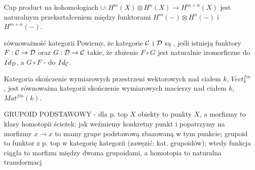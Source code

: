 \begin{example}
  Cup product na kohomologiach $\cup:H^m(X)\otimes H^n(X)\to H^{m+n}(X)$ jest naturalnym przekształceniem między funktorami $H^m(-)\otimes H^n(-)$ i $H^{m+n}(-)$.
\end{example}

\begin{definition}{równoważność kategorii}{}
  Powiemy, że kategorie $\mathcal{C}$ i $\mathcal{D}$ są , jeśli istnieją funktory $F:\mathcal{C}\to\mathcal{D}$ oraz $G:\mathcal{D}\to\mathcal{C}$ takie, że złożenie $F\circ G$ jest naturalnie izomorficzne do $Id_{\mathcal{D}}$, a $G\circ F$ - do $Id_{\mathcal{C}}$.
\end{definition}

\begin{example}
  Kategoria skończenie wymiarowych przestrzeni wektorowych nad ciałem $k$, $Vect_{k}^{fin}$, jest równoważna kategorii skończenie wymiarowych macierzy nad ciałem $k$, $Mat^{fin}(k)$.
\end{example}

{\color{red}GRUPOID PODSTAWOWY - dla p. top  $X$ obiekty to punkty $X$, a morfizmy to klasy homotopii ścieżek; jak weźmiemy konkretny punkt i popatrzymy na morfizmy $x\to x$ to mamy grupe podstawową zbazowaną w tym punkcie; grupoid to funktor z p. top w kategorię kategorii (zawęzić: kat. grupoidów); wtedy funkcja ciągła to morfizm między dwoma grupoidami, a homotopia to naturalna transformacj}
